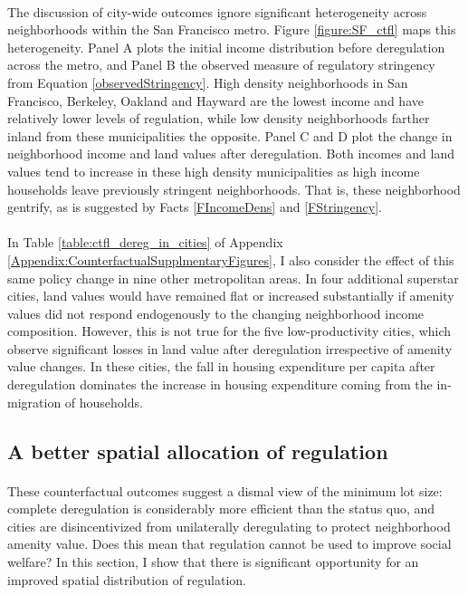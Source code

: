 \documentclass[12pt]{article}
\begin{document}
\paragraph*{}
 The discussion of city-wide outcomes ignore significant heterogeneity across neighborhoods within the San Francisco metro. Figure \ref{figure:SF_ctfl} maps this heterogeneity. Panel A plots the initial income distribution before deregulation across the metro, and Panel B the observed measure of regulatory stringency from Equation \eqref{observedStringency}. High density neighborhoods in San Francisco, Berkeley, Oakland and Hayward are the lowest income and have relatively lower levels of regulation, while low density neighborhoods farther inland from these municipalities the opposite. Panel C and D plot the change in neighborhood income and land values after deregulation. Both incomes and land values tend to increase in these high density municipalities as high income households leave previously stringent neighborhoods. That is, these neighborhood gentrify, as is suggested by Facts \ref{FIncomeDens} and \ref{FStringency}. 
 
  \paragraph*{}
 In Table \ref{table:ctfl_dereg_in_cities} of Appendix \ref{Appendix:CounterfactualSupplmentaryFigures}, I also consider the effect of this same policy change in nine other metropolitan areas. In four additional superstar cities, land values would have remained flat or increased substantially if amenity values did not respond endogenously to the changing neighborhood income composition. However, this is not true for the five low-productivity cities, which observe significant losses in land value after deregulation irrespective of amenity value changes. In these cities, the fall in housing expenditure per capita after deregulation dominates the increase in housing expenditure coming from the in-migration of households.
 
 
 \subsection{A better spatial allocation of regulation}
\paragraph*{}
These counterfactual outcomes suggest a dismal view of the minimum lot size: complete deregulation is considerably more efficient than the status quo, and cities are disincentivized from unilaterally deregulating to protect neighborhood amenity value. Does this mean that regulation cannot be used to improve social welfare? In this section, I show that there is significant opportunity for an improved spatial distribution of regulation. 
\end{document}
